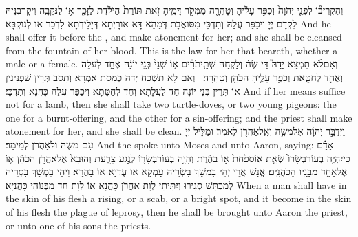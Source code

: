 {וְהִקְרִיב֞וֹ לִפְנֵ֤י יְהֹוָה֙ וְכִפֶּ֣ר עָלֶ֔יהָ וְטָהֲרָ֖ה מִמְּקֹ֣ר דָּמֶ֑יהָ זֹ֤את תּוֹרַת֙ הַיֹּלֶ֔דֶת לַזָּכָ֖ר א֥וֹ לַנְּקֵבָֽה׃}
{וִיקָרְבִנֵּיהּ לִקְדָם יְיָ וִיכַפַּר עֲלַהּ וְתִדְכֵּי מִסּוֹאֲבָת דְּמַהָא דָּא אוֹרָיְתָא דְּיָלֵידְתָּא לִדְכַר אוֹ לְנוּקְבָּא׃}
{And he shall offer it before the \lord, and make atonement for her; and she shall be cleansed from the fountain of her blood. This is the law for her that beareth, whether a male or a female.}{}
{וְאִם\maqqaf לֹ֨א תִמְצָ֣א יָדָהּ֮ דֵּ֣י שֶׂה֒ וְלָקְחָ֣ה שְׁתֵּֽי\maqqaf תֹרִ֗ים א֤וֹ שְׁנֵי֙ בְּנֵ֣י יוֹנָ֔ה אֶחָ֥ד לְעֹלָ֖ה וְאֶחָ֣ד לְחַטָּ֑את וְכִפֶּ֥ר עָלֶ֛יהָ הַכֹּהֵ֖ן וְטָהֵֽרָה׃ \petucha }
{וְאִם לָא תַשְׁכַּח יְדַהּ כְּמִסַּת אִמְּרָא וְתִסַּב ‏‏תְּרֵין שַׁפְנִינִין אוֹ תְּרֵין בְּנֵי יוֹנָה חַד לַעֲלָתָא וְחַד לְחַטָּתָא וִיכַפַּר עֲלַהּ כָּהֲנָא וְתִדְכֵּי׃}
{And if her means suffice not for a lamb, then she shall take two turtle-doves, or two young pigeons: the one for a burnt-offering, and the other for a sin-offering; and the priest shall make atonement for her, and she shall be clean.}{}
\newperek
{}%
{וַיְדַבֵּ֣ר יְהֹוָ֔ה אֶל\maqqaf מֹשֶׁ֥ה וְאֶֽל\maqqaf אַהֲרֹ֖ן לֵאמֹֽר׃}
{וּמַלֵּיל יְיָ עִם מֹשֶׁה וּלְאַהֲרֹן לְמֵימַר׃}
{And the \lord\space spoke unto Moses and unto Aaron, saying:}{}
{אָדָ֗ם כִּֽי\maqqaf יִהְיֶ֤ה בְעוֹר\maqqaf בְּשָׂרוֹ֙ שְׂאֵ֤ת אֽוֹ\maqqaf סַפַּ֙חַת֙ א֣וֹ בַהֶ֔רֶת וְהָיָ֥ה בְעוֹר\maqqaf בְּשָׂר֖וֹ לְנֶ֣גַע צָרָ֑עַת וְהוּבָא֙ אֶל\maqqaf אַהֲרֹ֣ן הַכֹּהֵ֔ן א֛וֹ אֶל\maqqaf אַחַ֥ד מִבָּנָ֖יו הַכֹּהֲנִֽים׃}
{אֱנָשׁ אֲרֵי יְהֵי בִמְשַׁךְ בִּשְׂרֵיהּ עָמְקָא אוֹ עֶדְיָא אוֹ בַהֲרָא וִיהֵי בִמְשַׁךְ בִּסְרֵיהּ לְמַכְתָּשׁ סְגִירוּ וְיִתֵּיתֵי לְוָת אַהֲרֹן כָּהֲנָא אוֹ לְוָת חַד מִבְּנוֹהִי כָּהֲנַיָּא׃}
{When a man shall have in the skin of his flesh a rising, or a scab, or a bright spot, and it become in the skin of his flesh the plague of leprosy, then he shall be brought unto Aaron the priest, or unto one of his sons the priests.}{}
